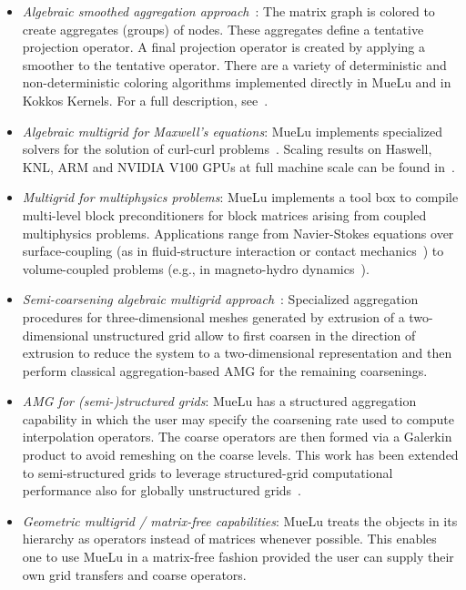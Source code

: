 \begin{itemize}
\item \emph{Algebraic smoothed aggregation approach}~\cite{Vanek1996a}:
The matrix graph is colored to create aggregates (groups) of nodes.
These aggregates define a tentative projection operator.
A final projection operator is created by applying a smoother to the tentative operator.
There are a variety of deterministic and non-deterministic coloring algorithms implemented directly
in MueLu and in Kokkos Kernels.  For a full description, see~\cite{BergerVergiat2023a}.

\item \emph{Algebraic multigrid for Maxwell's equations}:
  MueLu implements specialized solvers for the solution of curl-curl problems~\cite{BochevHuEtAl2008_AlgebraicMultigridApproachBased}.
  Scaling results on Haswell, KNL, ARM and NVIDIA V100 GPUs at full machine scale can be found in~\cite{BettencourtBrownEtAl2021_EmpirePic}.

\item \emph{Multigrid for multiphysics problems}:
MueLu implements a tool box to compile multi-level block preconditioners for block matrices arising from coupled multiphysics problems.
Applications range from Navier-Stokes equations
over surface-coupling (as in fluid\hyp{}structure interaction or contact mechanics~\cite{Wiesner2021a})
to volume-coupled problems (e.g., in magneto-hydro dynamics~\cite{Ohm2022a}).

\item \emph{Semi-coarsening algebraic multigrid approach}~\cite{Tuminaro2016a}:
Specialized aggregation procedures for three-dimensional meshes generated by extrusion of a two-dimensional unstructured grid
allow to first coarsen in the direction of extrusion to reduce the system to a two-dimensional representation and then perform classical aggregation-based AMG
for the remaining coarsenings.

\item \emph{AMG for (semi-)structured grids}:
MueLu has a structured aggregation capability in which the user may specify the coarsening rate used to compute interpolation operators.
The coarse operators are then formed via a Galerkin product to avoid remeshing on the coarse levels.
This work has been extended to semi-structured grids to leverage structured-grid computational performance also for globally unstructured grids~\cite{Mayr2022a}.

\item \emph{Geometric multigrid / matrix-free capabilities}:
MueLu treats the objects in its hierarchy as operators instead of matrices whenever possible.
This enables one to use MueLu in a matrix-free fashion provided the user can supply their own grid transfers and coarse operators.

\end{itemize}

